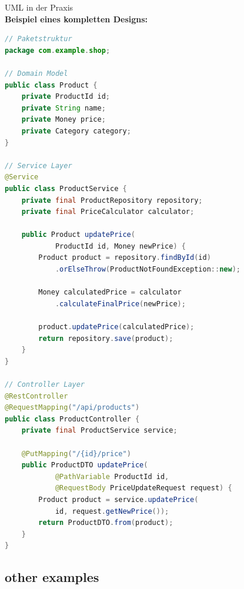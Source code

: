 \begin{example2}{UML in der Praxis}\\
\textbf{Beispiel eines kompletten Designs:}

\begin{lstlisting}[language=Java, style=basesmol]
// Paketstruktur
package com.example.shop;

// Domain Model
public class Product {
    private ProductId id;
    private String name;
    private Money price;
    private Category category;
}

// Service Layer
@Service
public class ProductService {
    private final ProductRepository repository;
    private final PriceCalculator calculator;
    
    public Product updatePrice(
            ProductId id, Money newPrice) {
        Product product = repository.findById(id)
            .orElseThrow(ProductNotFoundException::new);
            
        Money calculatedPrice = calculator
            .calculateFinalPrice(newPrice);
            
        product.updatePrice(calculatedPrice);
        return repository.save(product);
    }
}

// Controller Layer
@RestController
@RequestMapping("/api/products")
public class ProductController {
    private final ProductService service;
    
    @PutMapping("/{id}/price")
    public ProductDTO updatePrice(
            @PathVariable ProductId id,
            @RequestBody PriceUpdateRequest request) {
        Product product = service.updatePrice(
            id, request.getNewPrice());
        return ProductDTO.from(product);
    }
}
\end{lstlisting}
\end{example2}

\pagebreak



\subsection{other examples}

